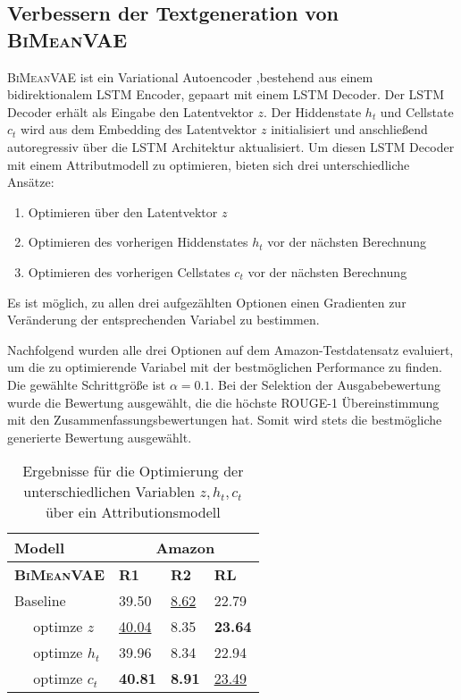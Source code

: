 \subsection{Verbessern der Textgeneration von \textsc{BiMeanVAE}}
\textsc{BiMeanVAE} ist ein Variational Autoencoder ,bestehend aus einem bidirektionalem LSTM Encoder, gepaart mit einem LSTM Decoder.
Der LSTM Decoder erhält als Eingabe den Latentvektor $z$. Der Hiddenstate $h_t$ und Cellstate $c_t$ wird aus dem Embedding des Latentvektor $z$ initialisiert und anschließend autoregressiv über die LSTM Architektur aktualisiert.
Um diesen LSTM Decoder mit einem Attributmodell zu optimieren, bieten sich drei unterschiedliche Ansätze:
\begin{enumerate}
    \item Optimieren über den Latentvektor $z$
    \item Optimieren des vorherigen Hiddenstates $h_t$ vor der nächsten Berechnung
    \item Optimieren des vorherigen Cellstates $c_t$ vor der nächsten Berechnung
\end{enumerate}

Es ist möglich, zu allen drei aufgezählten Optionen einen Gradienten zur Veränderung der entsprechenden Variabel zu bestimmen. 

Nachfolgend wurden alle drei Optionen auf dem Amazon-Testdatensatz evaluiert, um die zu optimierende Variabel mit der bestmöglichen Performance zu finden.
Die gewählte Schrittgröße ist $\alpha = 0.1$.
Bei der Selektion der Ausgabebewertung wurde die Bewertung ausgewählt, die die höchste ROUGE-1 Übereinstimmung mit den Zusammenfassungsbewertungen hat.
Somit wird stets die bestmögliche generierte Bewertung ausgewählt.

\begin{table}[h!]
    \centering
    \begin{tabular}{@{}llll@{}}
    \toprule
                    Modell   & \multicolumn{3}{c}{Amazon}              \\ \midrule
    \textbf{\textsc{BiMeanVAE}}    & \textbf{R1} & \textbf{R2} & \textbf{RL} \\ \midrule
    Baseline        & 39.50       & \underline{8.62}     &  22.79     \\
    $\quad$ optimze $z$        &   \underline{40.04}     &   8.35    &    \textbf{23.64}   \\
    $\quad$ optimze $h_t$      &  39.96   &    8.34  &  22.94  \\
    $\quad$ optimze $c_t$      &  \textbf{40.81}   &     \textbf{8.91}  &   \underline{23.49}    \\ \bottomrule
    \end{tabular}
    \caption{Ergebnisse für die Optimierung der unterschiedlichen Variablen $z,h_t,c_t$ über ein Attributionsmodell}
    \label{opt_bimeanvae}
\end{table}

